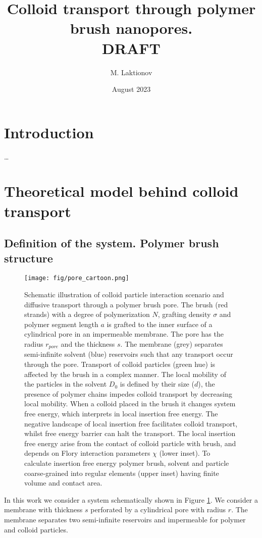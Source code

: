 \documentclass[12pt, a4paper]{article}
\title{Colloid transport through polymer brush nanopores. \\ DRAFT}
\author{M. Laktionov}
\date{August 2023}
\begin{document}
\maketitle

\section{Introduction}
\dots

\section{Theoretical model behind colloid transport}
\subsection{Definition of the system. Polymer brush structure}

\begin{figure}
    \centering
    \texttt{[image: fig/pore\_cartoon.png]}
    \caption{
        Schematic illustration of colloid particle interaction scenario and diffusive transport through a polymer brush pore. 
        The brush (red strands) with a degree of polymerization $N$, grafting density $\sigma$ and polymer segment length $a$ is grafted to the inner surface of a cylindrical pore in an impermeable membrane. The pore has the radius $r_{pore}$ and the thickness $s$.
        The membrane (grey) separates semi-infinite solvent (blue) reservoirs such that any transport occur through the pore. 
        Transport of colloid particles (green hue) is affected by the brush in a complex manner.
        The local mobility of the particles in the solvent $D_{0}$ is defined by their size ($d$), the presence of polymer chains impedes colloid transport by decreasing local mobility.
        When a colloid placed in the brush it changes system free energy, which interprets in local insertion free energy.
        The negative landscape of local insertion free facilitates colloid transport, whilst free energy barrier can halt the transport.
        The local insertion free energy arise from the contact of colloid particle with brush, and depends on Flory interaction parameters $\chi$ (lower inset). To calculate insertion free energy polymer brush, solvent and particle coarse-grained into regular elements (upper inset) having finite volume and contact area.
    }
    \label{fig:colloid_transport}
\end{figure}

In this work we consider a system schematically shown in Figure \ref{fig:colloid_transport}. We consider a membrane with thickness $s$ perforated by a cylindrical pore with radius $r$. %
The membrane separates two semi-infinite reservoirs and impermeable for polymer and colloid particles. 
\end{document}
